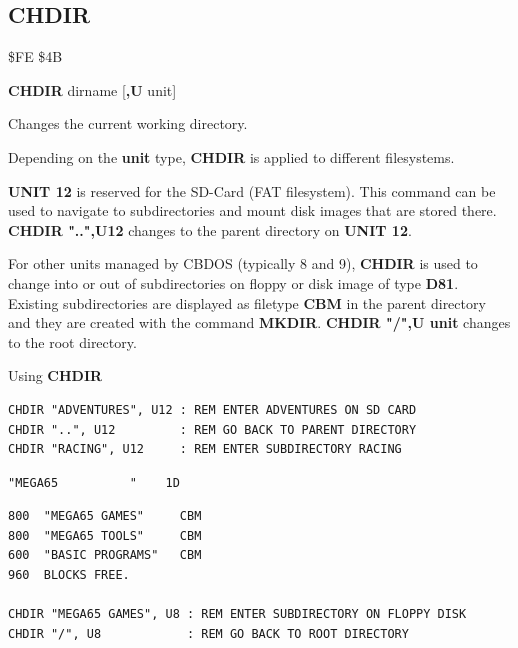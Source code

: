 \subsection{CHDIR}
\begin{description}[leftmargin=2cm,style=nextline]
\item [Token:]    \$FE \$4B

\item [Format:]   {\bf CHDIR} dirname [{\bf,U} unit]

\item [Usage:]    Changes the current working directory.

                  \dirnamedefinition

                  Depending on the {\bf unit} type, {\bf CHDIR} is applied to different filesystems.

                  {\bf UNIT 12} is reserved for the SD-Card (FAT filesystem). This command can be used to navigate to subdirectories and mount disk images that are stored there. {\bf CHDIR "..",U12} changes to the parent directory on {\bf UNIT 12}.

                  For other units managed by CBDOS (typically 8 and 9), {\bf CHDIR} is used to change into or out of subdirectories on floppy or disk image of type {\bf D81}. Existing subdirectories are displayed as filetype {\bf CBM} in the parent directory and they are created with the command {\bf MKDIR}. {\bf CHDIR "/",U unit} changes to the root directory.

\item [Examples:] Using {\bf CHDIR}

\begin{tcolorbox}[colback=black,coltext=white]
\verbatimfont{\codefont}
\begin{verbatim}
CHDIR "ADVENTURES", U12 : REM ENTER ADVENTURES ON SD CARD
CHDIR "..", U12         : REM GO BACK TO PARENT DIRECTORY
CHDIR "RACING", U12     : REM ENTER SUBDIRECTORY RACING
\end{verbatim}

\selectfont{\codefont 0}
\begin{tcolorbox}[colback=white,coltext=black,arc=0mm,boxrule=0mm,
       left*=0.5mm,right*=0mm,top=0mm,bottom=0mm,nobeforeafter,
       left skip=0.5mm,
       width=28mm,height=3mm,valign=center]
\begin{verbatim}
"MEGA65          "    1D
\end{verbatim}
\end{tcolorbox}
\begin{verbatim}
800  "MEGA65 GAMES"     CBM
800  "MEGA65 TOOLS"     CBM
600  "BASIC PROGRAMS"   CBM
960  BLOCKS FREE.

CHDIR "MEGA65 GAMES", U8 : REM ENTER SUBDIRECTORY ON FLOPPY DISK
CHDIR "/", U8            : REM GO BACK TO ROOT DIRECTORY
\end{verbatim}
\end{tcolorbox}
\end{description}

